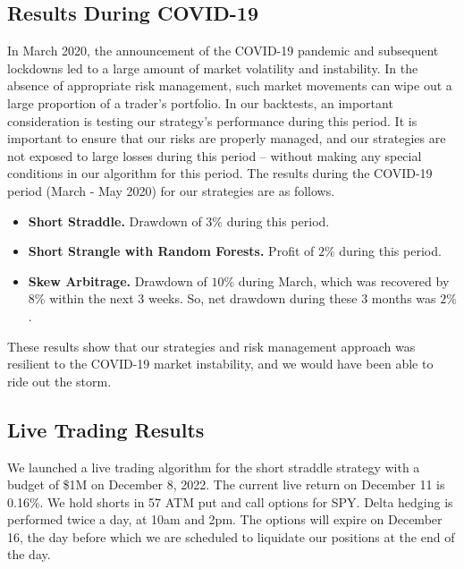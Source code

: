\documentclass[10pt]{article}
\theoremstyle{definition}
\begin{document}
\subsection{Results During COVID-19}
In March 2020, the announcement of the COVID-19 pandemic and subsequent lockdowns led to a large amount of market volatility and instability. In the absence of appropriate risk management, such market movements can wipe out a large proportion of a trader's portfolio. In our backtests, an important consideration is testing our strategy's performance during this period. It is important to ensure that our risks are properly managed, and our strategies are not exposed to large losses during this period -- without making any special conditions in our algorithm for this period. The results during the COVID-19 period (March - May 2020) for our strategies are as follows.
\begin{itemize}
    \item \textbf{Short Straddle.} Drawdown of $3\%$ during this period.
    \item \textbf{Short Strangle with Random Forests.} Profit of $2\%$ during this period.
    \item \textbf{Skew Arbitrage.} Drawdown of $10\%$ during March, which was recovered by $8\%$ within the next 3 weeks. So, net drawdown during these 3 months was $2\%$.
\end{itemize}
These results show that our strategies and risk management approach was resilient to the COVID-19 market instability, and we would have been able to ride out the storm.

\subsection{Live Trading Results}
We launched a live trading algorithm for the short straddle strategy with a budget of \$1M on December 8, 2022. The current live return on December 11 is 0.16\%. We hold shorts in 57 ATM put and call options for SPY. Delta hedging is performed twice a day, at 10am and 2pm. The options will expire on December 16, the day before which we are scheduled to liquidate our positions at the end of the day.
\end{document}

